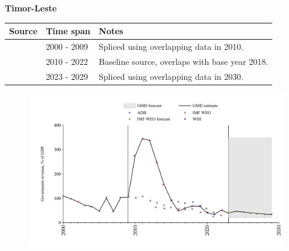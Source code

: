 \documentclass[12pt,a4paper,landscape]{article}
\begin{document}
\begin{adjustbox}{max totalsize={\paperwidth}{\paperheight},center}
\begin{minipage}[t][\textheight][t]{\textwidth}
\vspace*{0.5cm}
{}
\begin{center}
{\Large\bfseries Timor-Leste}
\end{center}
\vspace{0.5cm}
\begin{table}[H]
\centering
\small
\begin{tabular}{|l|l|l|}
\hline
\textbf{Source} & \textbf{Time span} & \textbf{Notes} \\
\hline
\rowcolor{white}\cite{IMF_WEO}& 2000 - 2009 &Spliced using overlapping data in 2010.\\
\rowcolor{lightgray}\cite{WDI}& 2010 - 2022 &Baseline source, overlaps with base year 2018.\\
\rowcolor{white}\cite{IMF_WEO_forecast}& 2023 - 2029 &Spliced using overlapping data in 2030.\\
\hline
\end{tabular}
\end{table}
\begin{figure}[H]
\centering
\includegraphics[width=\textwidth,height=0.6\textheight,keepaspectratio]{graphs/TLS_govrev_GDP.pdf}
\end{figure}
\end{minipage}
\end{adjustbox}
\end{document}
